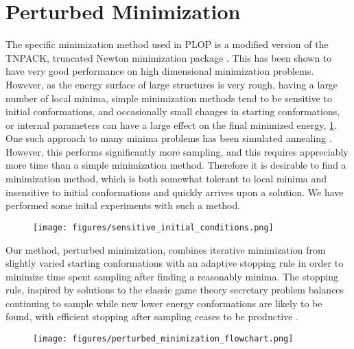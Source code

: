 \section{Perturbed Minimization}
\label{section:unsorted/perturbed_minimization}

The specific minimization method used in PLOP is a modified version of the TNPACK, truncated Newton minimization package \cite{schlick1992tnpack,schlick1992tnpack2}.
This has been shown to have very good performance on high dimensional minimization problems.
However, as the energy surface of large structures is very rough, having a large number of local minima, simple minimization methods tend to be sensitive to initial conformations, and occasionally small changes in starting conformations, or internal parameters can have a large effect on the final minimized energy, \ref{figure:sensitive_initial_conditions}.
One such approach to many minima problems has been simulated annealing \cite{kirkpatrick1983optimization,vcerny1985thermodynamical}.
However, this performs significantly more sampling, and this requires appreciably more time than a simple minimization method.
Therefore it is desirable to find a minimization method, which is both somewhat tolerant to local minima and insensitive to initial conformations and quickly arrives upon a solution.
We have performed some inital experiments with such a method.
\begin{figure}
\centering
\texttt{[image: figures/sensitive\_initial\_conditions.png]}
\caption{}
\label{figure:sensitive_initial_conditions}
\end{figure}

Our method, perturbed minimization, combines iterative minimization from slightly varied starting conformations with an adaptive stopping rule in order to minimize time spent sampling after finding a reasonably minima.
The stopping rule, inspired by solutions to the classic game theory secretary problem balances continuing to sample while new lower energy conformations are likely to be found, with efficient stopping after sampling ceases to be productive \cite{freeman1983secretary,chow1964optimal}.

\begin{figure}
\centering
\texttt{[image: figures/perturbed\_minimization\_flowchart.png]}
\caption{}
\label{figure:perturbed_minimization_flowchart}
\end{figure}


